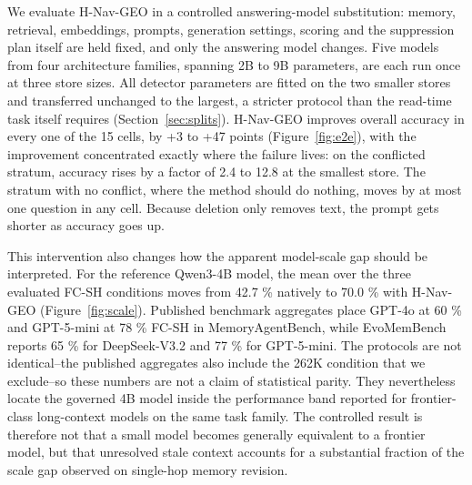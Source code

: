 \documentclass[journal=jcisd8,manuscript=article]{achemso}
\begin{document}
We evaluate H-Nav-GEO in a controlled answering-model substitution: memory, retrieval, embeddings, prompts, generation settings, scoring and the suppression plan itself are held fixed, and only the answering model changes. Five models from four architecture families, spanning 2B to 9B parameters, are each run once at three store sizes. All detector parameters are fitted on the two smaller stores and transferred unchanged to the largest, a stricter protocol than the read-time task itself requires (Section~\ref{sec:splits}). H-Nav-GEO improves overall accuracy in every one of the 15 cells, by +3 to +47 points (Figure~\ref{fig:e2e}), with the improvement concentrated exactly where the failure lives: on the conflicted stratum, accuracy rises by a factor of 2.4 to 12.8 at the smallest store. The stratum with no conflict, where the method should do nothing, moves by at most one question in any cell. Because deletion only removes text, the prompt gets shorter as accuracy goes up.

This intervention also changes how the apparent model-scale gap should be interpreted. For the reference Qwen3-4B model, the mean over the three evaluated FC-SH conditions moves from 42.7 \% natively to 70.0 \% with H-Nav-GEO (Figure~\ref{fig:scale}). Published benchmark aggregates place GPT-4o at 60 \% and GPT-5-mini at 78 \% FC-SH in MemoryAgentBench, while EvoMemBench reports 65 \% for DeepSeek-V3.2 and 77 \% for GPT-5-mini. The protocols are not identical--the published aggregates also include the 262K condition that we exclude--so these numbers are not a claim of statistical parity. They nevertheless locate the governed 4B model inside the performance band reported for frontier-class long-context models on the same task family. The controlled result is therefore not that a small model becomes generally equivalent to a frontier model, but that unresolved stale context accounts for a substantial fraction of the scale gap observed on single-hop memory revision.
\end{document}
